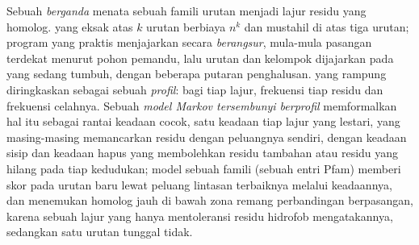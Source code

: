 \begin{definition}\label{def:b3:bioinformatics:msa}
%
Sebuah \emph{ berganda} menata sebuah famili urutan menjadi
lajur residu yang homolog.  yang eksak atas $k$
urutan berbiaya $n^{k}$ dan mustahil di atas tiga urutan; program yang praktis
menjajarkan secara \emph{berangsur}, mula-mula pasangan terdekat menurut pohon
pemandu, lalu urutan dan kelompok dijajarkan pada  yang sedang
tumbuh, dengan beberapa putaran penghalusan.  yang rampung
diringkaskan sebagai sebuah \emph{profil}: bagi tiap lajur, frekuensi tiap
residu dan frekuensi celahnya. Sebuah \emph{model Markov tersembunyi
berprofil} memformalkan hal itu sebagai rantai keadaan cocok, satu keadaan
tiap lajur yang lestari, yang masing-masing memancarkan residu dengan
peluangnya sendiri, dengan keadaan sisip dan keadaan hapus yang membolehkan
residu tambahan atau residu yang hilang pada tiap kedudukan; model sebuah
famili (sebuah entri Pfam) memberi skor pada urutan baru lewat peluang
lintasan terbaiknya melalui keadaannya, dan menemukan homolog jauh di bawah
zona remang perbandingan berpasangan, karena sebuah lajur yang hanya
mentoleransi residu hidrofob mengatakannya, sedangkan satu urutan tunggal
tidak.
\end{definition}

